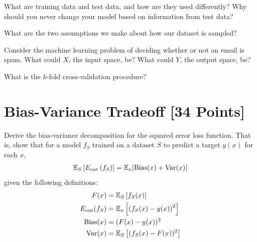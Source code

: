 \begin{problem}[2]
  What are training data and test data, and how are they used differently? Why should you never change your model based on information from test data?
\end{problem}
\begin{solution}
  
\end{solution}

\begin{problem}[2]
  What are the two assumptions we make about how our dataset is sampled?
\end{problem}
\begin{solution}
  
\end{solution}

\begin{problem}[2]
  Consider the machine learning problem of deciding whether or not an email is spam. What could $X$, the input space, be? What could $Y$, the output space, be?
\end{problem}
\begin{solution}
  
\end{solution}

\begin{problem}[2]
  What is the $k$-fold cross-validation procedure?
\end{problem}
\begin{solution}
  
\end{solution}




\newpage
\section{Bias-Variance Tradeoff [34 Points]}

\begin{problem}[5]
  Derive the bias-variance decomposition for the squared error loss function. That is, show that for a model $f_S$ trained on a dataset $S$ to predict a target $y(x)$ for each $x$,
  \begin{align*}
    \mathbb{E}_S \left[E_\text{out}\left(f_S\right)\right] = \mathbb{E}_x[\operatorname{Bias}(x) + \operatorname{Var}(x)]
  \end{align*}
  given the following definitions:
  \begin{align*}
    F(x) &= \mathbb{E}_S\left[f_S(x) \right] \\
    E_\text{out}(f_S) &= \mathbb{E}_x\left[\left(f_S(x) - y(x)\right)^2\right] \\
    \operatorname{Bias}(x) &= (F(x) - y(x))^2 \\
    \operatorname{Var}(x) &= \mathbb{E}_S\left[(f_S(x)-F(x))^2\right]
  \end{align*}
\end{problem}

